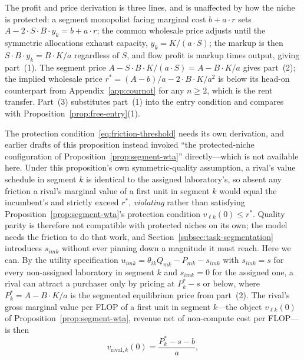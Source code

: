 \documentclass[11pt]{article}
\begin{document}
The profit and price derivation is three lines, and is unaffected by how the niche is protected: a segment monopolist facing marginal cost $b+a\cdot r$ sets $A-2\cdot S\cdot B\cdot y_k=b+a\cdot r$; the common wholesale price adjusts until the symmetric allocations exhaust capacity, $y_k=K/(a\cdot S)$; the markup is then $S\cdot B\cdot y_k=B\cdot K/a$ regardless of $S$, and flow profit is markup times output, giving part~(1). The segment price $A-S\cdot B\cdot K/(a\cdot S)=A-B\cdot K/a$ gives part~(2); the implied wholesale price $r^{*}=(A-b)/a-2\cdot B\cdot K/a^{2}$ is below its head-on counterpart from Appendix~\ref{app:cournot} for any $n\geq2$, which is the rent transfer. Part~(3) substitutes part~(1) into the entry condition and compares with Proposition~\ref{prop:free-entry}(1).

The protection condition~\eqref{eq:friction-threshold} needs its own derivation, and earlier drafts of this proposition instead invoked ``the protected-niche configuration of Proposition~\ref{prop:segment-wta}'' directly---which is not available here. Under this proposition's own symmetric-quality assumption, a rival's value schedule in segment $k$ is identical to the assigned laboratory's, so absent any friction a rival's marginal value of a first unit in segment $k$ would equal the incumbent's and strictly exceed $r^*$, \emph{violating} rather than satisfying Proposition~\ref{prop:segment-wta}'s protection condition $v_{\ell k}(0)\leq r^*$. Quality parity is therefore not compatible with protected niches on its own; the model needs the friction to do that work, and Section~\ref{subsec:task-segmentation} introduces $s_{imk}$ without ever pinning down a magnitude it must reach. Here we can. By the utility specification $u_{imk}=\theta_{ik}Q_{mk}-P_{mk}-s_{imk}$ with $s_{imk}=s$ for every non-assigned laboratory in segment $k$ and $s_{imk}=0$ for the assigned one, a rival can attract a purchaser only by pricing at $P_k^*-s$ or below, where $P_k^*=A-B\cdot K/a$ is the segmented equilibrium price from part~(2). The rival's gross marginal value per FLOP of a first unit in segment $k$---the object $v_{\ell k}(0)$ of Proposition~\ref{prop:segment-wta}, revenue net of non-compute cost per FLOP---is then
\begin{equation}v_{\mathrm{rival},k}(0)=\frac{P_k^*-s-b}{a},\end{equation}
\end{document}

